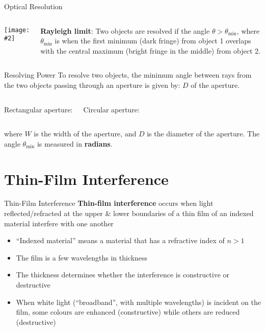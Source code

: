 \documentclass[compress,aspectratio=169]{beamer}
\newcommand{\pic}[2]{\texttt{[image: \#2]}}
\newcommand{\eq}[2]{\vspace{#1}{\LARGE\begin{displaymath}#2\end{displaymath}}}
\begin{document}
\begin{frame}{Optical Resolution}
  \begin{columns}
    \pic{1}{graphics/resolve4.png}

    \textbf{Rayleigh limit}: Two objects are resolved if the angle
      $\theta>\theta_\mathrm{min}$, where $\theta_\mathrm{min}$ is when the first
      minimum (dark fringe) from object 1 overlaps with the central maximum
      (bright fringe in the middle) from object 2.
  \end{columns}
\end{frame}


\begin{frame}{Resolving Power}
  To resolve two objects, the minimum angle between rays from the two objects
  passing through an aperture is given by:
  $D$ of the aperture.
  \vspace{0.2in}
  \begin{columns}
    Rectangular aperture:

    \eq{-.2in}{
      \boxed{\theta_\mathrm{min}=\frac{\lambda}{W}}
    }
    Circular aperture:

    \eq{-.2in}{
      \boxed{\theta_\mathrm{min}=\frac{1.22\lambda}{D}}
    }
  \end{columns}
  where $W$ is the width of the aperture, and $D$ is the diameter of the
  aperture. The angle $\theta_\mathrm{min}$ is measured in \textbf{radians}.
\end{frame}


\section[Thin Film]{Thin-Film Interference}

\begin{frame}{Thin-Film Interference}
  \textbf{Thin-film interference} occurs when light reflected/refracted at
  the upper \& lower boundaries of a thin film of an indexed material interfere
  with one another
  \begin{itemize}
  \item ``Indexed material'' means a material that has a refractive index of
    $n>1$
  \item The film is a few wavelengths in thickness
  \item The thickness determines whether the interference is constructive or
    destructive
  \item When white light (``broadband'', with multiple wavelengths) is incident
    on the film, some colours are enhanced (constructive) while others are
    reduced (destructive)
  \end{itemize}
\end{frame}
\end{document}
